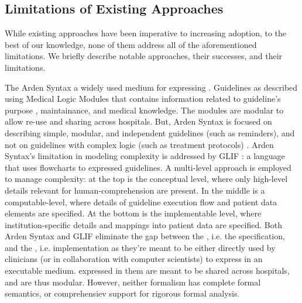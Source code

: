 \subsection{Limitations of Existing Approaches}

While existing approaches have been imperative to increasing \CGS{} adoption, to the
best of our knowledge, none of them address all of the aforementioned
limitations. We briefly describe notable approaches, their successes, and their limitations.

The Arden Syntax \cite{HripcsakCBM94} a widely used medium for
expressing \CIGs{}.  Guidelines as described using Medical
Logic Modules that contains information related to guideline's purpose
, maintainance, and medical knowledge. The modules are modular to allow
re-use and sharing across hospitals. But, Arden Syntax
is focused on describing simple, modular, and independent
guidelines (such as reminders), and not on guidelines with complex logic (such
as treatment protocols) \cite{PelegJBI01}.
Arden Syntax's limitation in modeling complexity is addressed by
GLIF \cite{BoxwalaJBI04}: a language that uses flowcharts to expressed
guidelines. A multi-level approach is
employed to manage complexity: at the top is the conceptual level, where
only high-level details relevant for human-comprehension are present. In the
middle is a computable-level, where details of guideline execution flow
and patient data elements are specified. At the bottom is the implementable
level, where institution-specific details and mappings into patient data are
specified. Both Arden Syntax and GLIF  eliminate
the gap between the \BPG{}, i.e. the specification, and the \CIG{}, i.e. implementation as
they're meant to be either directly used by clinicians (or in collaboration with
computer scientists) to express \BPGs{} in an executable medium. \CIGs{}
expressed in them are meant to be shared across hospitals, and are thus modular.
However, neither formalism has complete formal semantics, or comprehensiev support for
rigorous formal analysis.

